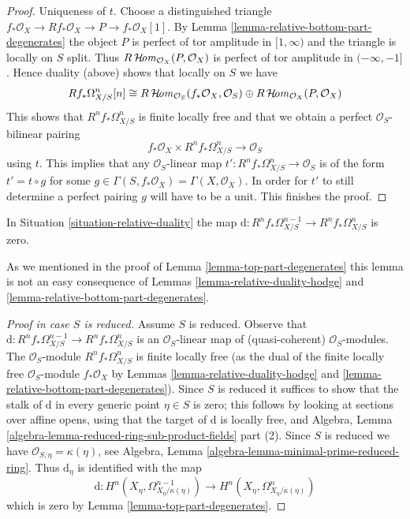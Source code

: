 \begin{proof}
\medskip\noindent
Uniqueness of $t$. Choose a distinguished triangle
$f_*\mathcal{O}_X \to Rf_*\mathcal{O}_X \to P \to f_*\mathcal{O}_X[1]$.
By Lemma \ref{lemma-relative-bottom-part-degenerates}
the object $P$ is perfect of tor amplitude in $[1, \infty)$
and the triangle is locally on $S$ split.
Thus $R\mathop{\mathcal{H}\!\mathit{om}}\nolimits_{\mathcal{O}_X}(P, \mathcal{O}_X)$ is perfect
of tor amplitude in $(-\infty, -1]$. Hence duality (above) shows that
locally on $S$ we have
$$
Rf_*\Omega^n_{X/S}[n] \cong
R\mathop{\mathcal{H}\!\mathit{om}}\nolimits_{\mathcal{O}_S}(f_*\mathcal{O}_X, \mathcal{O}_S)
\oplus R\mathop{\mathcal{H}\!\mathit{om}}\nolimits_{\mathcal{O}_X}(P, \mathcal{O}_X)
$$
This shows that $R^nf_*\Omega^n_{X/S}$ is finite locally free and
that we obtain a perfect $\mathcal{O}_S$-bilinear pairing
$$
f_*\mathcal{O}_X \times R^nf_*\Omega^n_{X/S} \longrightarrow \mathcal{O}_S
$$
using $t$.
This implies that any $\mathcal{O}_S$-linear map
$t' : R^nf_*\Omega^n_{X/S} \to \mathcal{O}_S$ is of the form
$t' = t \circ g$ for some
$g \in \Gamma(S, f_*\mathcal{O}_X) = \Gamma(X, \mathcal{O}_X)$.
In order for $t'$ to still determine a perfect pairing $g$ will have
to be a unit. This finishes the proof.
\end{proof}

\begin{lemma}
\label{lemma-relative-top-part-degenerates}
In Situation \ref{situation-relative-duality} the map
$\text{d} : R^nf_*\Omega^{n - 1}_{X/S} \to R^nf_*\Omega^n_{X/S}$
is zero.
\end{lemma}

\noindent
As we mentioned in the proof of Lemma \ref{lemma-top-part-degenerates}
this lemma is not an easy consequence of Lemmas
\ref{lemma-relative-duality-hodge} and
\ref{lemma-relative-bottom-part-degenerates}.

\begin{proof}[Proof in case $S$ is reduced]
Assume $S$ is reduced. Observe that
$\text{d} : R^nf_*\Omega^{n - 1}_{X/S} \to R^nf_*\Omega^n_{X/S}$
is an $\mathcal{O}_S$-linear map of (quasi-coherent) $\mathcal{O}_S$-modules.
The $\mathcal{O}_S$-module $R^nf_*\Omega^n_{X/S}$ is finite locally free
(as the dual of the finite locally free $\mathcal{O}_S$-module
$f_*\mathcal{O}_X$ by Lemmas
\ref{lemma-relative-duality-hodge} and
\ref{lemma-relative-bottom-part-degenerates}).
Since $S$ is reduced it suffices to show that
the stalk of $\text{d}$ in every generic point $\eta \in S$
is zero; this follows by looking at sections over affine opens,
using that the target of $\text{d}$ is locally free, and
Algebra, Lemma \ref{algebra-lemma-reduced-ring-sub-product-fields} part (2).
Since $S$ is reduced we have $\mathcal{O}_{S, \eta} = \kappa(\eta)$, see
Algebra, Lemma \ref{algebra-lemma-minimal-prime-reduced-ring}.
Thus $\text{d}_\eta$ is identified with the map
$$
\text{d} :
H^n(X_\eta, \Omega^{n - 1}_{X_\eta/\kappa(\eta)})
\longrightarrow
H^n(X_\eta, \Omega^n_{X_\eta/\kappa(\eta)})
$$
which is zero by Lemma \ref{lemma-top-part-degenerates}.
\end{proof}

